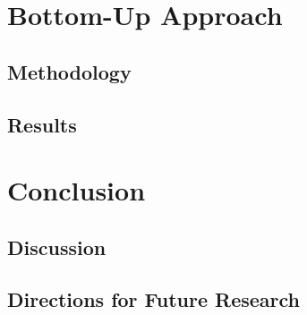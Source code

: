\documentclass[onehalf,11pt]{beavtex}
\begin{document}
\chapter{Bottom-Up Approach}
\section{Methodology}
\section{Results}


\chapter{Conclusion}
\section{Discussion}
\section{Directions for Future Research}






%
\end{document}

